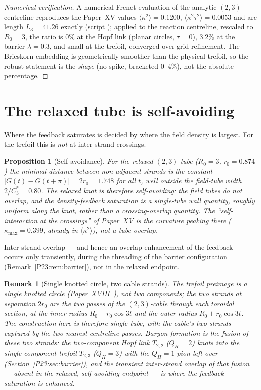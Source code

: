 \documentclass[11pt,a4paper]{article}
\newtheorem{proposition}[theorem]{Proposition}
\newtheorem{remark}[theorem]{Remark}
\theoremstyle{definition}\newtheorem{definition}[theorem]{Definition}
\newcommand{\QH}{Q_H}
\begin{document}
\begin{proof}[Numerical verification]
A numerical Frenet evaluation of the analytic $(2,3)$ centreline reproduces the Paper~XV values
$\langle\kappa^2\rangle=0.1200$, $\langle\kappa^2\tau^2\rangle=0.0053$ and arc length
$L_3=41.26$ exactly (script ); applied to the reaction centreline,
rescaled to $R_0=3$, the ratio is $0\%$ at the Hopf link (planar circles, $\tau=0$), $3.2\%$ at
the barrier $\lambda=0.3$, and small at the trefoil, converged over grid refinement. The
Brieskorn embedding is geometrically smoother than the physical trefoil, so the robust statement
is the \emph{shape} (no spike, bracketed $0$--$4\%$), not the absolute percentage.
\end{proof}

\section{The relaxed tube is self-avoiding}
\label{P23:sec:selfavoid}
Where the feedback saturates is decided by where the field density is largest. For the trefoil
this is \emph{not} at inter-strand crossings.

\begin{proposition}[Self-avoidance]
\label{P23:prop:selfavoid}
For the relaxed $(2,3)$ tube ($R_0=3$, $r_0=0.874$) the minimal distance between non-adjacent
strands is the constant $|G(t)-G(t+\pi)|=2r_0=1.748$ for all $t$, well outside the field-tube
width $2/C_3^\ast=0.80$. The relaxed knot is therefore self-avoiding: the field tubes do not
overlap, and the density-feedback saturation is a single-tube \emph{wall} quantity, roughly
uniform along the knot, rather than a crossing-overlap quantity. The ``self-interaction at the
crossings'' of Paper~XV is the \emph{curvature} peaking there
($\kappa_{\max}=0.399$, already in $\langle\kappa^2\rangle$), not a tube overlap.
\end{proposition}

Inter-strand overlap --- and hence an overlap enhancement of the feedback --- occurs only
transiently, during the threading of the barrier configuration
(Remark~\ref{P23:rem:barrier}), not in the relaxed endpoint.

\begin{remark}[Single knotted circle, two cable strands]
\label{P23:rem:cable}
The trefoil preimage is a \emph{single knotted circle} (Paper~XVIII~\cite{Paper18}), not two
components; the two strands at separation $2r_0$ are the two passes of the $(2,3)$-cable through
each toroidal section, at the inner radius $R_0-r_0\cos3t$ and the outer radius
$R_0+r_0\cos3t$. The construction here is therefore single-tube, with the cable's two strands
captured by the two nearest centreline passes. Baryon formation is the \emph{fusion} of these
two strands: the two-component Hopf link $T_{2,2}$ ($\QH=2$) knots into the single-component
trefoil $T_{2,3}$ ($\QH=3$) with the $\QH=1$ pion left over
(Section~\ref{P23:sec:barrier}), and the transient inter-strand overlap of that fusion ---
absent in the relaxed, self-avoiding endpoint --- is where the feedback saturation is enhanced.
\end{remark}
\end{document}
